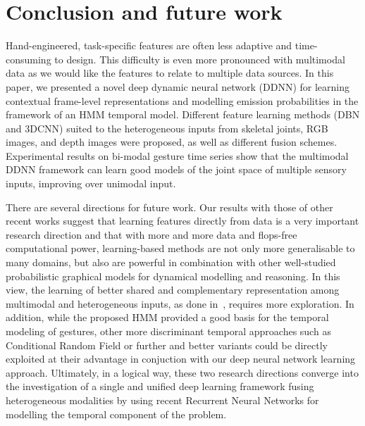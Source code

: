 
\section{Conclusion and future work}
\label{sec:conclusion}

Hand-engineered, task-specific features are often less adaptive and time-consuming to design. 
This difficulty is even more pronounced with multimodal data as we would like the features 
to relate to multiple data sources.
%
In this paper, we presented a novel deep dynamic neural network (DDNN) 
for learning contextual frame-level representations and modelling emission probabilities in the framework of an HMM temporal model.
%
Different feature learning methods (DBN and 3DCNN) suited to the heterogeneous inputs from skeletal joints, RGB images, and depth images 
were proposed, as well as different fusion schemes.
%
Experimental results on bi-modal gesture time series  show that the multimodal DDNN framework can learn 
good models of the joint space of multiple sensory inputs, improving over  unimodal input. 



There are several directions for future work. 
%
Our results with those of other recent works suggest that learning features directly from data is a very important research direction 
and that with more and more data and flops-free  computational power, learning-based methods are not only more generalisable to many domains, 
but also are powerful in combination  with other well-studied probabilistic graphical models 
for dynamical modelling and reasoning.
%
In this view, the learning of  better shared and complementary representation among multimodal  and heterogeneous  inputs,
as done in~\cite{neverova2014moddrop}, requires more exploration.
%
In addition, while the proposed HMM provided a good basis for the temporal modeling of gestures, 
other more discriminant temporal approaches such as Conditional Random Field or further and better variants 
\cite{wang2006hidden} could be directly exploited at their advantage in conjuction with our deep neural network  learning approach.
%
Ultimately, in a logical way, these two research directions converge into the investigation of 
a single and unified deep learning framework fusing heterogeneous modalities 
by using recent Recurrent Neural Networks for modelling the temporal component of the problem.


\endinput
